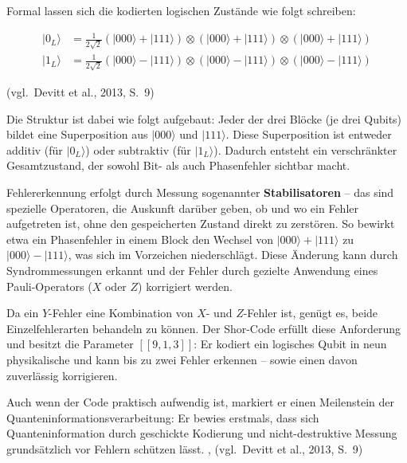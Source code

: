 \medskip

Formal lassen sich die kodierten logischen Zustände wie folgt schreiben:

\[
\begin{aligned}
|0_L\rangle &= \frac{1}{2\sqrt{2}} (|000\rangle + |111\rangle) \otimes (|000\rangle + |111\rangle) \otimes (|000\rangle + |111\rangle) \\
|1_L\rangle &= \frac{1}{2\sqrt{2}} (|000\rangle - |111\rangle) \otimes (|000\rangle - |111\rangle) \otimes (|000\rangle - |111\rangle)
\end{aligned}
\]

(vgl.\ Devitt et al., 2013, S.~9)

\medskip

Die Struktur ist dabei wie folgt aufgebaut: Jeder der drei Blöcke (je drei Qubits) bildet eine Superposition aus \(|000\rangle\) und \(|111\rangle\). Diese Superposition ist entweder additiv (für \(|0_L\rangle\)) oder subtraktiv (für \(|1_L\rangle\)). Dadurch entsteht ein verschränkter Gesamtzustand, der sowohl Bit- als auch Phasenfehler sichtbar macht.

\medskip

Fehlererkennung erfolgt durch Messung sogenannter \textbf{Stabilisatoren} – das sind spezielle Operatoren, die Auskunft darüber geben, ob und wo ein Fehler aufgetreten ist, ohne den gespeicherten Zustand direkt zu zerstören. So bewirkt etwa ein Phasenfehler in einem Block den Wechsel von \(|000\rangle + |111\rangle\) zu \(|000\rangle - |111\rangle\), was sich im Vorzeichen niederschlägt. Diese Änderung kann durch Syndrommessungen erkannt und der Fehler durch gezielte Anwendung eines Pauli-Operators (\(X\) oder \(Z\)) korrigiert werden.

Da ein \(Y\)-Fehler eine Kombination von \(X\)- und \(Z\)-Fehler ist, genügt es, beide Einzelfehlerarten behandeln zu können. Der Shor-Code erfüllt diese Anforderung und besitzt die Parameter \([[9, 1, 3]]\): Er kodiert ein logisches Qubit in neun physikalische und kann bis zu zwei Fehler erkennen – sowie einen davon zuverlässig korrigieren.

\medskip

Auch wenn der Code praktisch aufwendig ist, markiert er einen Meilenstein der Quanteninformationsverarbeitung: Er bewies erstmals, dass sich Quanteninformation durch geschickte Kodierung und nicht-destruktive Messung grundsätzlich vor Fehlern schützen lässt. \cite[Seite 432–434]{nielsen_quantum_2010}, (vgl.\ Devitt et al., 2013, S.~9)\\



